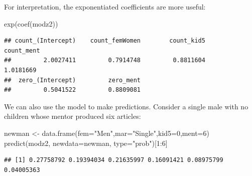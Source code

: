 \documentclass[
  ignorenonframetext,
]{beamer}
\newenvironment{Shaded}{\begin{snugshade}}{\end{snugshade}}
\newcommand{\AttributeTok}[1]{\textcolor[rgb]{0.77,0.63,0.00}{#1}}
\newcommand{\DecValTok}[1]{\textcolor[rgb]{0.00,0.00,0.81}{#1}}
\newcommand{\FunctionTok}[1]{\textcolor[rgb]{0.00,0.00,0.00}{#1}}
\newcommand{\NormalTok}[1]{#1}
\newcommand{\OtherTok}[1]{\textcolor[rgb]{0.56,0.35,0.01}{#1}}
\newcommand{\SpecialCharTok}[1]{\textcolor[rgb]{0.00,0.00,0.00}{#1}}
\newcommand{\StringTok}[1]{\textcolor[rgb]{0.31,0.60,0.02}{#1}}
\begin{document}
\begin{frame}[fragile]{}
\protect\hypertarget{section-37}{}
For interpretation, the exponentiated coefficients are more useful:

\vspace{12pt}
\tiny

\begin{Shaded}
\begin{Highlighting}[]
\FunctionTok{exp}\NormalTok{(}\FunctionTok{coef}\NormalTok{(modz2))}
\end{Highlighting}
\end{Shaded}

\begin{verbatim}
## count_(Intercept)    count_femWomen        count_kid5        count_ment 
##         2.0027411         0.7914748         0.8811604         1.0181669 
##  zero_(Intercept)         zero_ment 
##         0.5041522         0.8809081
\end{verbatim}

\vspace{12pt}
\normalsize

We can also use the model to make predictions. Consider a single male
with no children whose mentor produced six articles:

\vspace{12pt}
\tiny

\begin{Shaded}
\begin{Highlighting}[]
\NormalTok{newman }\OtherTok{\textless{}{-}} \FunctionTok{data.frame}\NormalTok{(}\AttributeTok{fem=}\StringTok{"Men"}\NormalTok{,}\AttributeTok{mar=}\StringTok{"Single"}\NormalTok{,}\AttributeTok{kid5=}\DecValTok{0}\NormalTok{,}\AttributeTok{ment=}\DecValTok{6}\NormalTok{)}
\FunctionTok{predict}\NormalTok{(modz2, }\AttributeTok{newdata=}\NormalTok{newman, }\AttributeTok{type=}\StringTok{"prob"}\NormalTok{)[}\DecValTok{1}\SpecialCharTok{:}\DecValTok{6}\NormalTok{]}
\end{Highlighting}
\end{Shaded}

\begin{verbatim}
## [1] 0.27758792 0.19394034 0.21635997 0.16091421 0.08975799 0.04005363
\end{verbatim}
\end{frame}
\end{document}

